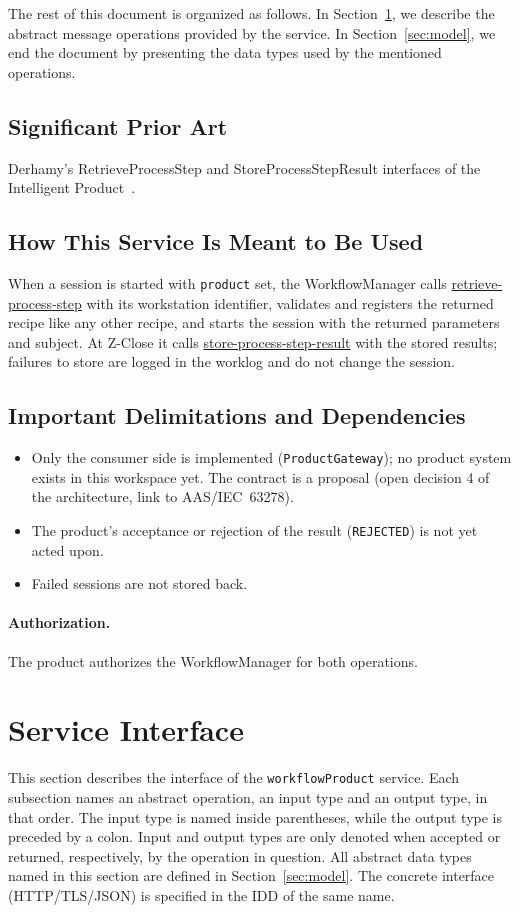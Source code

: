 \documentclass[a4paper]{arrowhead}
\newcommand{\oref}[1]{{\textcolor{ArrowheadBlue}{\hyperref[sec:operations:#1]{#1}}}}
\begin{document}
The rest of this document is organized as follows.
In Section~\ref{sec:operations}, we describe the abstract message operations provided by the service.
In Section~\ref{sec:model}, we end the document by presenting the data types used by the mentioned operations.

\subsection{Significant Prior Art}
Derhamy's RetrieveProcessStep and StoreProcessStepResult interfaces of the Intelligent
Product~\cite{derhamy2018workflow}.

\subsection{How This Service Is Meant to Be Used}
When a session is started with \texttt{product} set, the WorkflowManager calls \oref{retrieve-process-step}
with its workstation identifier, validates and registers the returned recipe like any other recipe, and starts the
session with the returned parameters and subject. At Z-Close it calls \oref{store-process-step-result} with the stored
results; failures to store are logged in the worklog and do not change the session.

\subsection{Important Delimitations and Dependencies}
\label{sec:delimitations}
\begin{itemize}
\item Only the consumer side is implemented (\texttt{Product\allowbreak{}Gateway}); no product system exists in this workspace yet. The contract is a proposal (open decision 4 of the architecture, link to AAS/IEC~63278).
\item The product's acceptance or rejection of the result (\texttt{REJECTED}) is not yet acted upon.
\item Failed sessions are not stored back.
\end{itemize}

\paragraph{Authorization.} The product authorizes the WorkflowManager for both operations.

\newpage
\section{Service Interface}
\label{sec:operations}
This section describes the interface of the \texttt{workflow\allowbreak{}Product} service. Each subsection names an abstract operation,
an input type and an output type, in that order. The input type is named inside parentheses, while the output type is
preceded by a colon. Input and output types are only denoted when accepted or returned, respectively, by the operation
in question. All abstract data types named in this section are defined in Section~\ref{sec:model}. The concrete
interface (HTTP/TLS/JSON) is specified in the IDD of the same name.
\end{document}
